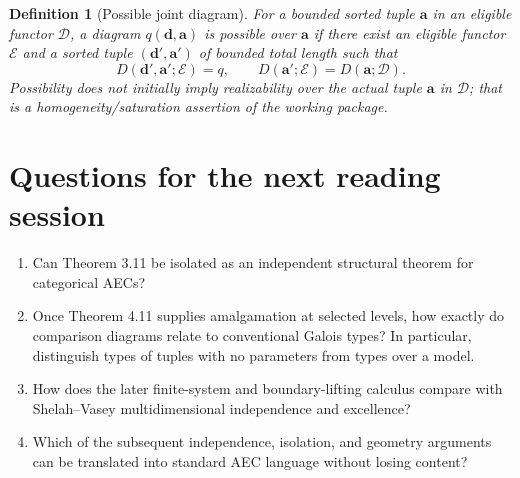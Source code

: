 \documentclass[11pt]{article}
\newcommand{\ba}{\mathbf{a}}
\newcommand{\bd}{\mathbf{d}}
\theoremstyle{plain}
\newtheorem{definition}{Definition}[section]
\begin{document}
\begin{definition}[Possible joint diagram]
For a bounded sorted tuple $\ba$ in
an eligible functor $\mathcal D$,
a diagram $q(\bd,\ba)$ is
\emph{possible over $\ba$} if
there exist an eligible functor
$\mathcal E$ and a sorted tuple
$(\bd',\ba')$ of bounded total length
such that
\[
D(\bd',\ba';\mathcal E)=q,\qquad
D(\ba';\mathcal E)=D(\ba;\mathcal D).
\]
Possibility does not initially imply
realizability over the actual tuple
$\ba$ in $\mathcal D$; that is a
homogeneity/saturation assertion
of the working package.
\end{definition}



\section{Questions for the next reading session}
\begin{enumerate}
\item Can Theorem 3.11 be isolated as an independent structural theorem for categorical AECs?
\item Once Theorem 4.11 supplies amalgamation at selected levels, how exactly do comparison diagrams relate to conventional Galois types? In particular, distinguish types of tuples with no parameters from types over a model.
\item How does the later finite-system and boundary-lifting calculus compare with Shelah--Vasey multidimensional independence and excellence?
\item Which of the subsequent independence, isolation, and geometry arguments can be translated into standard AEC language without losing content?
\end{enumerate}
\end{document}
